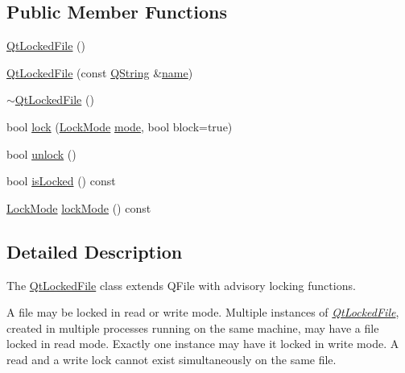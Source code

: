 \subsection*{Public Member Functions}
\begin{DoxyCompactItemize}
\item 
\hyperlink{class_shared_tools_1_1_qt_locked_file_ae5ace5574511e5205df025a316cc71fc}{Qt\-Locked\-File} ()
\item 
\hyperlink{class_shared_tools_1_1_qt_locked_file_a6fdeb77acd21ab32905dff2c88af39b7}{Qt\-Locked\-File} (const \hyperlink{group___u_a_v_objects_plugin_gab9d252f49c333c94a72f97ce3105a32d}{Q\-String} \&\hyperlink{glext_8h_ad977737dfc9a274a62741b9500c49a32}{name})
\item 
\hyperlink{class_shared_tools_1_1_qt_locked_file_a2b8be83f7c4ab09bb90740baafae414a}{$\sim$\-Qt\-Locked\-File} ()
\item 
bool \hyperlink{class_shared_tools_1_1_qt_locked_file_a699007e880a1a0d22868e0d1b58a8cd1}{lock} (\hyperlink{class_shared_tools_1_1_qt_locked_file_aaa69b096bf94afaae92f0ebcec10f2ed}{Lock\-Mode} \hyperlink{glext_8h_a1e71d9c196e4683cc06c4b54d53f7ef5}{mode}, bool block=true)
\item 
bool \hyperlink{class_shared_tools_1_1_qt_locked_file_aa1b8a9fb6b6ef26b6c8bb24d1e7ce832}{unlock} ()
\item 
bool \hyperlink{class_shared_tools_1_1_qt_locked_file_a743c5a172709f06b8eee2ee63f84a0fc}{is\-Locked} () const 
\item 
\hyperlink{class_shared_tools_1_1_qt_locked_file_aaa69b096bf94afaae92f0ebcec10f2ed}{Lock\-Mode} \hyperlink{class_shared_tools_1_1_qt_locked_file_a103815203ce6d27e45aea5d37e6d76cf}{lock\-Mode} () const 
\end{DoxyCompactItemize}


\subsection{Detailed Description}
The \hyperlink{class_shared_tools_1_1_qt_locked_file}{Qt\-Locked\-File} class extends Q\-File with advisory locking functions. 

A file may be locked in read or write mode. Multiple instances of {\itshape \hyperlink{class_shared_tools_1_1_qt_locked_file}{Qt\-Locked\-File}}, created in multiple processes running on the same machine, may have a file locked in read mode. Exactly one instance may have it locked in write mode. A read and a write lock cannot exist simultaneously on the same file.

